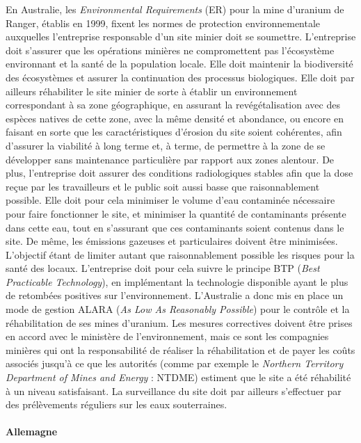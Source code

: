 \documentclass{article}
\begin{document}
En Australie, les \textit{Environmental Requirements} (ER) pour la mine d’uranium de Ranger, établis en 1999, fixent les normes de protection environnementale auxquelles l’entreprise responsable d’un site minier doit se soumettre. L’entreprise doit s’assurer que les opérations minières ne compromettent pas l’écosystème environnant et la santé de la population locale. Elle doit maintenir la biodiversité des écosystèmes et assurer la continuation des processus biologiques. Elle doit par ailleurs réhabiliter le site minier de sorte à établir un environnement correspondant à sa zone géographique, en assurant la revégétalisation avec des espèces natives de cette zone, avec la même densité et abondance, ou encore en faisant en sorte que les caractéristiques d’érosion du site soient cohérentes, afin d’assurer la viabilité à long terme et, à terme, de permettre à la zone de se développer sans maintenance particulière par rapport aux zones alentour. De plus, l’entreprise doit assurer des conditions radiologiques stables afin que la dose reçue par les travailleurs et le public soit aussi basse que raisonnablement possible. Elle doit pour cela minimiser le volume d’eau contaminée nécessaire pour faire fonctionner le site, et minimiser la quantité de contaminants présente dans cette eau, tout en s’assurant que ces contaminants soient contenus dans le site. De même, les émissions gazeuses et particulaires doivent être minimisées. L’objectif étant de limiter autant que raisonnablement possible les risques pour la santé des locaux. L’entreprise doit pour cela suivre le principe BTP (\textit{Best Practicable Technology}), en implémentant la technologie disponible ayant le plus de retombées positives sur l’environnement. L’Australie a donc mis en place un mode de gestion ALARA (\textit{As Low As Reasonably Possible}) pour le contrôle et la réhabilitation de ses mines d’uranium.
Les mesures correctives doivent être prises en accord avec le ministère de l’environnement, mais ce sont les compagnies minières qui ont la responsabilité de réaliser la réhabilitation et de payer les coûts associés jusqu’à ce que les autorités (comme par exemple le \textit{Northern Territory Department of Mines and Energy} : NTDME) estiment que le site a été réhabilité à un niveau satisfaisant. La surveillance du site doit par ailleurs s’effectuer par des prélèvements réguliers sur les eaux souterraines.

\paragraph{Allemagne}
\end{document}
